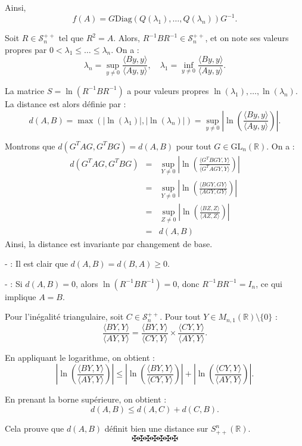 Ainsi,
\[ f (A) = G \text{Diag} (Q (\lambda_1), \ldots, Q (\lambda_n)) G^{- 1} . \]


Soit $R \in \mathcal{S}^{+ +}_n$ tel que $R^2 = A$. Alors, $R^{- 1} BR^{- 1}
\in \mathcal{S}^{+ +}_n$, et on note ses valeurs propres par $0 < \lambda_1
\leq \ldots \leq \lambda_n$. On a :
\[ \lambda_n = \underset{y \neq 0}{\sup}   \frac{\langle By, y
   \rangle}{\langle Ay, y \rangle}, \quad \lambda_1 = \underset{y \neq 0}{\inf
   }  \frac{\langle By, y \rangle}{\langle Ay, y \rangle} . \]


La matrice $S = \ln (R^{- 1} BR^{- 1})$ a pour valeurs propres $\ln
(\lambda_1), \ldots, \ln (\lambda_n)$. La distance est alors d{\'e}finie par :
\[ d (A, B) = \max (| \ln (\lambda_1) |, | \ln (\lambda_n) |) = \underset{y
   \neq 0}{\sup} \left| \ln \left( \frac{\langle By, y \rangle}{\langle Ay, y
   \rangle} \right) \right| . \]


Montrons que $d (G^T AG, G^T BG) = d (A, B)$ pour tout $G \in \text{GL}_n
(\mathbb{R})$. On a :
\begin{eqnarray*}
  d (G^T AG, G^T BG) & = & \underset{Y \neq 0}{\sup} \left| \ln \left(
  \frac{\langle G^T BGY, Y \rangle}{\langle G^T AGY, Y \rangle} \right)
  \right|\\
  & = &  \underset{Y \neq 0}{\sup} \left| \ln \left( \frac{\langle BGY, GY
  \rangle}{\langle AGY, GY \rangle} \right) \right|\\
  & = & \underset{Z \neq 0}{\sup} \left| \ln \left( \frac{\langle BZ, Z
  \rangle}{\langle AZ, Z \rangle} \right) \right|\\
  & = & d (A, B)
\end{eqnarray*}
Ainsi, la distance est invariante par changement de base.


-  : Il est clair que $d (A, B) = d (B, A) \geq 0$.

-  : Si $d (A, B) = 0$, alors $\ln (R^{- 1} BR^{-
1}) = 0$, donc $R^{- 1} BR^{- 1} = I_n$, ce qui implique $A = B$.

Pour l'in{\'e}galit{\'e} triangulaire, soit $C \in \mathcal{S}^{+ +}_n$. Pour
tout $Y \in M_{n, 1} (\mathbb{R}) \setminus \{0\}$ :
\[ \frac{\langle BY, Y \rangle}{\langle AY, Y \rangle} = \frac{\langle BY, Y
   \rangle}{\langle CY, Y \rangle} \times \frac{\langle CY, Y \rangle}{\langle
   AY, Y \rangle} . \]


En appliquant le logarithme, on obtient :
\[ \left| \ln \left( \frac{\langle BY, Y \rangle}{\langle AY, Y \rangle}
   \right) \right| \leq \left| \ln \left( \frac{\langle BY, Y \rangle}{\langle
   CY, Y \rangle} \right) \right| + \left| \ln \left( \frac{\langle CY, Y
   \rangle}{\langle AY, Y \rangle} \right) \right| . \]


En prenant la borne sup{\'e}rieure, on obtient :
\[ d (A, B) \leq d (A, C) + d (C, B) . \]


Cela prouve que $d (A, B)$ d{\'e}finit bien une distance sur $S_{+ +}^n
(\mathbb{R})$.
\[ \maltese \maltese \maltese \maltese \maltese \maltese \maltese \]
